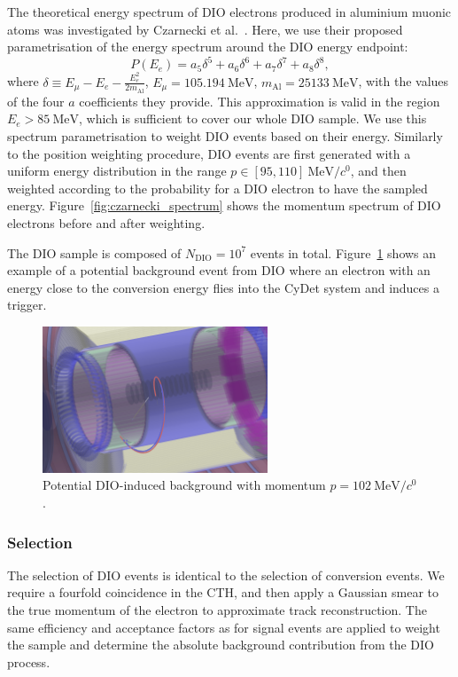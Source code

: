The theoretical energy spectrum of DIO electrons produced in aluminium muonic
atoms was investigated by Czarnecki et al.~\cite{czarnecki}. Here, we use their
proposed parametrisation of the energy spectrum around the DIO energy endpoint:
\begin{equation}\label{eq:czarnecki_param}
P(E_e) = a_5 \delta^5 + a_6 \delta^6 + a_7 \delta^7 + a_8 \delta^8,
\end{equation}
where $\delta \equiv E_\mu  - E_e - \frac{E_e^2}{2 m_\mathrm{Al}}$, $E_\mu =
\SI{105.194}{\MeV}$, $m_\mathrm{Al} = \SI{25133}{\MeV}$, with the values of the
four $a$ coefficients they provide. This approximation is valid in the region
$E_e > \SI{85}{\MeV}$, which is sufficient to cover our whole DIO sample. We
use this spectrum parametrisation to weight DIO events based on their energy.
Similarly to the position weighting procedure, DIO events are first generated
with a uniform energy distribution in the range $p \in [95,
110]~\si{\MeV/\clight}$, and then weighted according to the probability for a
DIO electron to have the sampled energy. Figure~\ref{fig:czarnecki_spectrum}
shows the momentum spectrum of DIO electrons before and after weighting.

The DIO sample is composed of $N_\mathrm{DIO} = 10^7$ events in total.
Figure~\ref{fig:muon_dio_in_cydet} shows an example of a potential background
event from DIO where an electron with an energy close to the conversion energy
flies into the CyDet system and induces a trigger.

\begin{figure}
    \centering
    \includegraphics[width=0.6\textwidth]{chapter6/dio_event_in_cydet.png}
    \caption{Potential DIO-induced background with momentum $p=\SI{102}{\MeV/\clight}$.}
    \label{fig:muon_dio_in_cydet}
\end{figure}

\subsubsection{Selection}
The selection of DIO events is identical to the selection of conversion events.
We require a fourfold coincidence in the CTH, and then apply a Gaussian smear to
the true momentum of the electron to approximate track reconstruction. The same
efficiency and acceptance factors as for signal events are applied to weight the
sample and determine the absolute background contribution from the DIO process.


